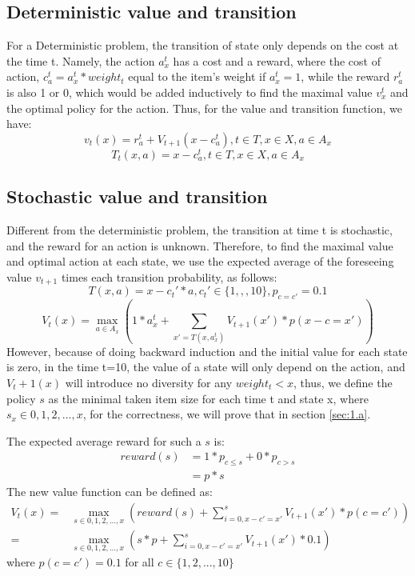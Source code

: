 \subsection{Deterministic value and transition}
For a Deterministic problem, the transition of state only depends on the cost at the time t. Namely, the action $a^t_x$ has a cost and a reward, where the cost of action, $c^t_a = a^t_x * weight_t$ equal to the item's weight if $a^t_x = 1$, while the reward $r^t_a$ is also 1 or 0, which would be added inductively to find the maximal value $v^t_x$ and the optimal policy for the action. Thus, for the value and transition function, we have:
\begin{equation}
    v_t(x) = r^t_a + V_{t+1}(x-c^t_a),t\in T, x \in X, a\in A_x
\end{equation}
\begin{equation}
    T_t(x,a) = x - c^t_a, t\in T, x \in X, a\in A_x
\end{equation}

\subsection{Stochastic value and transition}
Different from the deterministic problem, the transition at time t is stochastic, and the reward for an action is unknown. Therefore, to find the maximal value and optimal action at each state, we use the expected average of the foreseeing value $v_{t+1}$ times each transition probability, as follows:
\begin{equation}
    T(x,a) = x - c_t'*a, c_t'\in \{1,,,10\}, p_{c=c'} = 0.1
\end{equation}
\begin{equation}
    V_t(x) = \max_{a\in A_x}(1*a_x^t + \sum_{x' = T(x,a_x^t)} V_{t+1}(x')*p(x-c=x'))
\end{equation}
However, because of doing backward induction and the initial value for each state is zero, in the time t=10, the value of a state will only depend on the action, and $V_t+1(x)$ will introduce no diversity for any $weight_t<x$, thus, we define the policy $s$ as the minimal taken item size for each time t and state x, where $s_x \in {0,1,2,...,x}$, for the correctness, we will prove that in section \ref{sec:1.a}.

The expected average reward for such a $s$ is:
\begin{equation}
    \begin{aligned}
    reward(s)  
    & =1*p_{c\leq s} + 0 * p_{c > s}\\
    & =p*s
    \end{aligned}
\end{equation}
The new value function can be defined as:
\begin{equation}
\begin{aligned}
    V_t(x) = &\max_{s\in {0,1,2,...,x}}(reward(s) + \sum\limits_{i=0,x-c'=x'}^s V_{t+1}(x')*p(c=c'))\\
    =&\max_{s\in {0,1,2,...,x}}(s*p + \sum\limits_{i=0,x-c'=x'}^s V_{t+1}(x')*0.1)
\end{aligned}
\end{equation}
where $p(c=c')=0.1$ for all $c\in \{1,2,...,10\}$
